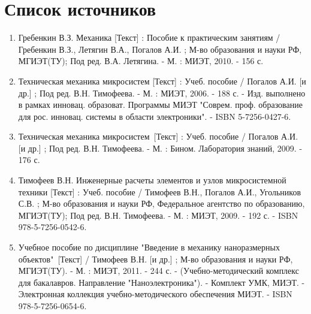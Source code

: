 \section{Список источников}

\begin{enumerate}
    \item Гребенкин В.З. Механика [Текст] : Пособие к практическим занятиям / Гребенкин В.З., Летягин В.А., Погалов А.И. ; М-во образования и науки РФ, МГИЭТ(ТУ); Под ред. В.А. Летягина. - М. : МИЭТ, 2010. - 156 с.
    \item Техническая механика микросистем [Текст] : Учеб. пособие / Погалов А.И. [и др.] ; Под ред. В.Н. Тимофеева. - М. : МИЭТ, 2006. - 188 с. - Изд. выполнено в рамках инновац. образоват. Программы МИЭТ "Соврем. проф. образование для рос. инновац. системы в области электроники". - ISBN 5-7256-0427-6.
    \item Техническая механика микросистем [Текст] : Учеб. пособие / Погалов А.И. [и др.] ; Под ред. В.Н. Тимофеева. - М. : Бином. Лаборатория знаний, 2009. - 176 с. 
    \item Тимофеев В.Н. Инженерные расчеты элементов и узлов микросистемной техники [Текст] : Учеб. пособие / Тимофеев В.Н., Погалов А.И., Угольников С.В. ; М-во образования и науки РФ, Федеральное агентство по образованию, МГИЭТ(ТУ); Под ред. В.Н. Тимофеева. - М. : МИЭТ, 2009. - 192 с. - ISBN 978-5-7256-0542-6.
    \item Учебное пособие по дисциплине "Введение в механику наноразмерных объектов" [Текст] / Тимофеев В.Н. [и др.] ; М-во образования и науки РФ, МГИЭТ(ТУ). - М. : МИЭТ, 2011. - 244 с. - (Учебно-методический комплекс для бакалавров. Направление "Наноэлектроника"). - Комплект УМК, МИЭТ. - Электронная коллекция учебно-методического обеспечения МИЭТ. - ISBN 978-5-7256-0654-6.
\end{enumerate}
